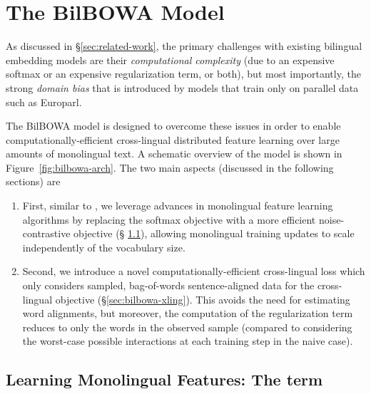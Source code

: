 \documentclass[10pt]{article}
\begin{document}
\section{The BilBOWA Model}
\label{sec:bilbowa}

As discussed in \S \ref{sec:related-work}, the primary challenges with existing
bilingual embedding models are their \emph{computational complexity} (due to an
expensive softmax or an expensive regularization term, or both), but most
importantly, the strong \emph{domain bias} that is introduced by models that
train only on parallel data such as Europarl. 

The BilBOWA model is designed to overcome these issues in order to enable 
computationally-efficient cross-lingual distributed feature learning over large 
amounts of monolingual text. A schematic overview of the
model is shown in Figure~\ref{fig:bilbowa-arch}. The two main aspects (discussed in the
following sections) are
\begin{enumerate}
  \item First, similar to \cite{zoubilingual}, we leverage advances in
    monolingual feature learning algorithms by replacing the softmax objective
    with a more efficient noise-contrastive objective (\S
    \ref{sec:bilbowa-monoling}), allowing monolingual training updates to scale
    independently of the vocabulary size.
  \item Second, we introduce a novel computationally-efficient cross-lingual loss 
    which only considers sampled, bag-of-words sentence-aligned data
    for the cross-lingual objective (\S \ref{sec:bilbowa-xling}). This avoids
    the need for estimating word alignments, but moreover, the computation of
    the regularization term reduces to only the words in the observed sample
    (compared to considering the  worst-case possible interactions at
    each training step in the naive case). 
\end{enumerate}

\subsection{Learning Monolingual Features: The  term}
\label{sec:bilbowa-monoling}
\end{document}
